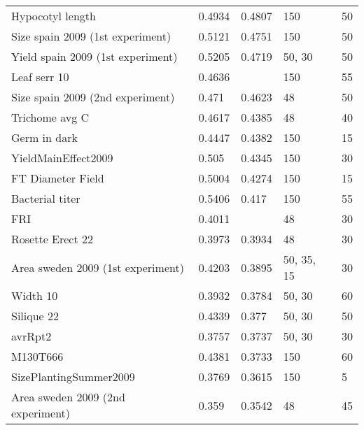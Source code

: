 \begin{longtable}{p{} p{} p{} p{} p{}}
  Hypocotyl length                   & 0.4934  & 0.4807               & 150          & 50     \\
  Size spain 2009 (1st experiment)   & 0.5121  & 0.4751               & 150          & 50     \\
  Yield spain 2009 (1st experiment)  & 0.5205  & 0.4719               & 50, 30       & 50     \\
  Leaf serr 10                       & 0.4636  & \color{red}{0.4683}  & 150          & 55     \\
  Size spain 2009 (2nd experiment)   & 0.471   & 0.4623               & 48           & 50     \\
  Trichome avg C                     & 0.4617  & 0.4385               & 48           & 40     \\
  Germ in dark                       & 0.4447  & 0.4382               & 150          & 15     \\
  YieldMainEffect2009                & 0.505   & 0.4345               & 150          & 30     \\
  FT Diameter Field                  & 0.5004  & 0.4274               & 150          & 15     \\
  Bacterial titer                    & 0.5406  & 0.417                & 150          & 55     \\
  FRI                                & 0.4011  & \color{red}{0.4119}  & 48           & 30     \\
  Rosette Erect 22                   & 0.3973  & 0.3934               & 48           & 30     \\
  Area sweden 2009 (1st experiment)  & 0.4203  & 0.3895               & 50, 35, 15   & 30     \\
  Width 10                           & 0.3932  & 0.3784               & 50, 30       & 60     \\
  Silique 22                         & 0.4339  & 0.377                & 50, 30       & 50     \\
  avrRpt2                            & 0.3757  & 0.3737               & 50, 30       & 30     \\
  M130T666                           & 0.4381  & 0.3733               & 150          & 60     \\
  SizePlantingSummer2009             & 0.3769  & 0.3615               & 150          & 5      \\
  Area sweden 2009 (2nd experiment)  & 0.359   & 0.3542               & 48           & 45     \\

\end{longtable}
